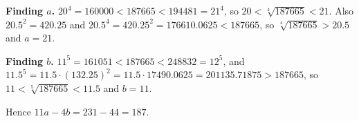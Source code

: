 \textbf{Finding $a$.} $20^4=160000<187665<194481=21^4$, so $20<\sqrt[4]{187665}<21$. Also $20.5^2=420.25$ and $20.5^4=420.25^2=176610.0625<187665$, so $\sqrt[4]{187665}>20.5$ and $a=21$.

\textbf{Finding $b$.} $11^5=161051<187665<248832=12^5$, and $11.5^5=11.5\cdot(132.25)^2=11.5\cdot17490.0625=201135.71875>187665$, so $11<\sqrt[5]{187665}<11.5$ and $b=11$.

Hence $11a-4b=231-44=\boxed{187}$.
